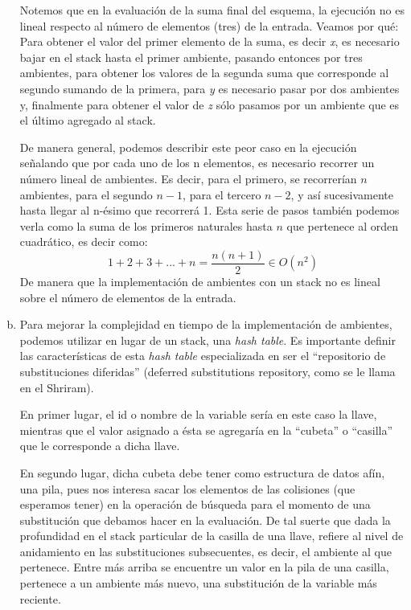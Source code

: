 \documentclass[12pt]{article}
\begin{document}
\begin{enumerate}[a)]
\par
\indent Notemos que en la evaluación de la suma final del esquema, la ejecución no es lineal respecto al número de elementos (tres) de la entrada.
Veamos por qué: Para obtener el valor del primer elemento de la suma, es decir \textit{x}, es necesario bajar en el stack hasta el primer ambiente,
pasando entonces por tres ambientes, para obtener los valores de la segunda suma que corresponde al segundo sumando de la primera, para \textit{y}
es necesario pasar por dos ambientes y, finalmente para obtener el valor de \textit{z} sólo pasamos por un ambiente que es el último agregado al
stack.\par
\indent De manera general, podemos describir este peor caso en la ejecución señalando que por cada uno de los n elementos, es necesario recorrer
un número lineal de ambientes. Es decir, para el primero, se recorrerían $n$ ambientes, para el segundo $n-1$, para el tercero $n-2$, y así sucesivamente hasta llegar al n-ésimo que recorrerá 1. Esta serie de pasos también podemos verla como la suma de los primeros naturales hasta $n$ que pertenece al orden cuadrático,
es decir como:
\begin{equation}
  1+2+3+...+n = \frac{n(n+1)}{2} \in O(n^2)
\end{equation}
De manera que la implementación de ambientes con un stack no es lineal sobre el número de elementos de la entrada.

\item Para mejorar la complejidad en tiempo de la implementación de ambientes, podemos utilizar en lugar de un stack, una \textit{hash table}.
  Es importante definir las características de esta \textit{hash table} especializada en ser el ``repositorio de substituciones diferidas'' (deferred substitutions repository, como se le llama en el Shriram).\par
  En primer lugar, el id o nombre de la variable sería en este caso la llave, mientras que el valor asignado a ésta se agregaría en la ``cubeta'' o ``casilla'' que le corresponde a dicha llave.\par
  En segundo lugar, dicha cubeta debe tener como estructura de datos afín, una pila, pues nos interesa sacar los elementos de las colisiones (que esperamos tener) en la operación de búsqueda para el momento de una substitución que debamos hacer en la evaluación. De tal suerte que dada la profundidad en el stack particular de la casilla de una llave, refiere al nivel de anidamiento en las substituciones subsecuentes, es decir, el ambiente al que pertenece. Entre más arriba se encuentre un valor en la pila de una casilla, pertenece a un ambiente más nuevo, una substitución de la variable más reciente. 
  

\end{enumerate}
\end{document}
